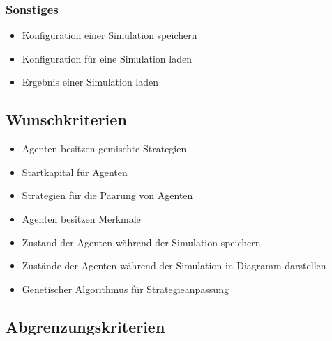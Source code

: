 \subsubsection{Sonstiges}
\begin{itemize}
\item Konfiguration einer Simulation speichern
\item Konfiguration für eine Simulation laden
\item Ergebnis einer Simulation laden
\end{itemize}

\subsection{Wunschkriterien}
\begin{itemize}
\item Agenten besitzen gemischte Strategien
\item Startkapital für Agenten
\item Strategien für die Paarung von Agenten
\item Agenten besitzen Merkmale
\item Zustand der Agenten während der Simulation speichern
\item Zustände der Agenten während der Simulation in Diagramm darstellen
\item Genetischer Algorithmus für Strategieanpassung
\end{itemize}

\subsection{Abgrenzungskriterien}
